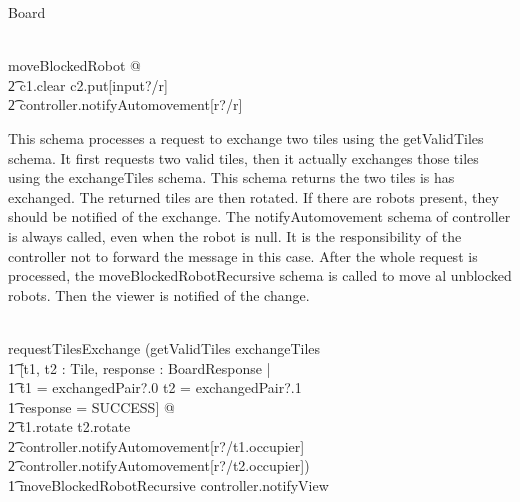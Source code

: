 \documentclass[12pt]{article}
\begin{document}
\begin{class}{Board}
\begin{zpar}
\end{zpar} \\
moveBlockedRobot \sdef [c1, c2 : \dom tiles, r : \dom robots, \\ \t1 response : BoardResponse | \\ \t1 tiles(c1) \in ConveyorTile \wedge tiles(c1).occupier = r \; \; \wedge \\ \t1 conveyorDest(c1) \not = c1 \wedge conveyorDest(c1) = c2 \; \; \wedge \\ \t1
(\IF tiles(c2) \in HomeTile \wedge tiles(c2).target = r \\ \t1
\THEN response = WIN \\ \t1
\ELSE response = SUCCESS)] @ \\ \t2 c1.clear \wedge c2.put[input?/r] \; \; \wedge \\ \t2 controller.notifyAutomovement[r?/r] \\
\also \also \also
\begin{zpar}
This schema processes a request to exchange two tiles using the getValidTiles schema. It first requests two valid tiles, then it actually exchanges those tiles using the exchangeTiles schema.
This schema returns the two tiles is has exchanged. The returned tiles are then rotated. If there are robots present, they should
be notified of the exchange. The notifyAutomovement schema of controller is always called, even when the robot is null. It is the responsibility of the controller not to forward the message in this case.
After the whole request is processed, the moveBlockedRobotRecursive schema is called to move al unblocked robots. Then the viewer is notified of the change.
\end{zpar} \\
requestTilesExchange \sdef (getValidTiles \comp exchangeTiles \; \; \comp \\
\t1 [t1, t2 : Tile, response : BoardResponse | \\ \t1 t1 = exchangedPair?.0 \wedge t2 = exchangedPair?.1 \; \; \wedge \\ \t1 response = SUCCESS] @ \\ \t2 t1.rotate \wedge t2.rotate \; \; \wedge \\ \t2 controller.notifyAutomovement[r?/t1.occupier] \; \; \wedge \\ \t2 controller.notifyAutomovement[r?/t2.occupier]) \; \; \comp \\ \t1 moveBlockedRobotRecursive \comp controller.notifyView \\
\znewpage
\begin{zpar}

\end{zpar}
\end{class}
\end{document}

